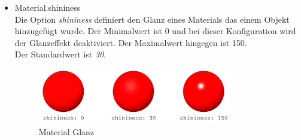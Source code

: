 \begin{itemize}
\item Material.shininess \\
Die Option \textit{shininess} definiert den Glanz eines Materials das einem Objekt hinzugefügt wurde. Der Minimalwert ist 0 und bei dieser Konfiguration wird der Glanzeffekt deaktiviert. Der Maximalwert hingegen ist 150.\\ Der Standardwert ist \textit{30}.
\begin{figure}[h]
    \centering
    \includegraphics[width=0.8\textwidth]{images/shininess.png}
    \caption{Material Glanz}
    \label{fig:my_label}
\end{figure}
\end{itemize}
\newpage
